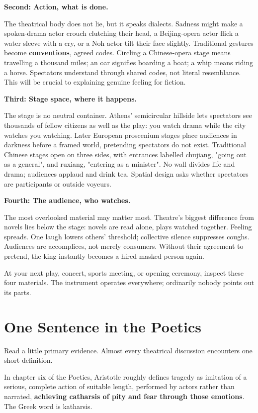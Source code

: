 \textbf{Second: Action, what is done.}

The theatrical body does not lie, but it speaks dialects. Sadness might make a spoken-drama actor crouch clutching their head, a Beijing-opera actor flick a water sleeve with a cry, or a Noh actor tilt their face slightly. Traditional gestures become \textbf{conventions}, agreed codes. Circling a Chinese-opera stage means travelling a thousand miles; an oar signifies boarding a boat; a whip means riding a horse. Spectators understand through shared codes, not literal resemblance. This will be crucial to explaining genuine feeling for fiction.

\textbf{Third: Stage space, where it happens.}

The stage is no neutral container. Athens' semicircular hillside lets spectators see thousands of fellow citizens as well as the play: you watch drama while the city watches you watching. Later European proscenium stages place audiences in darkness before a framed world, pretending spectators do not exist. Traditional Chinese stages open on three sides, with entrances labelled chujiang, "going out as a general", and ruxiang, "entering as a minister". No wall divides life and drama; audiences applaud and drink tea. Spatial design asks whether spectators are participants or outside voyeurs.

\textbf{Fourth: The audience, who watches.}

The most overlooked material may matter most. Theatre's biggest difference from novels lies below the stage: novels are read alone, plays watched together. Feeling spreads. One laugh lowers others' threshold; collective silence suppresses coughs. Audiences are accomplices, not merely consumers. Without their agreement to pretend, the king instantly becomes a hired masked person again.

At your next play, concert, sports meeting, or opening ceremony, inspect these four materials. The instrument operates everywhere; ordinarily nobody points out its parts.

\section{One Sentence in the Poetics}
Read a little primary evidence. Almost every theatrical discussion encounters one short definition.

In chapter six of the Poetics, Aristotle roughly defines tragedy as imitation of a serious, complete action of suitable length, performed by actors rather than narrated, \textbf{achieving catharsis of pity and fear through those emotions}. The Greek word is katharsis.

